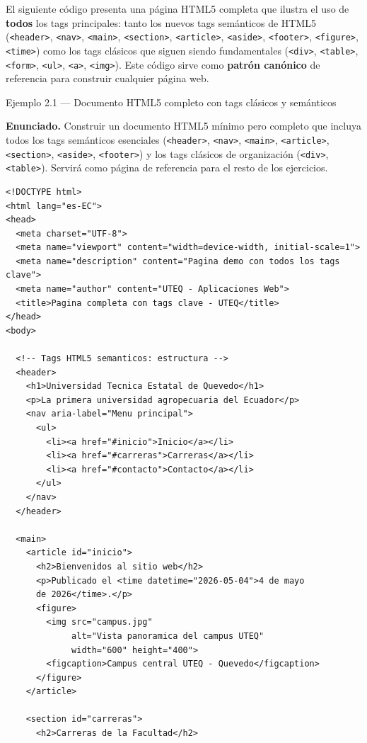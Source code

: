 El siguiente código presenta una página HTML5 completa que ilustra
el uso de \textbf{todos} los tags principales: tanto los nuevos tags
semánticos de HTML5 (\texttt{<header>}, \texttt{<nav>},
\texttt{<main>}, \texttt{<section>}, \texttt{<article>},
\texttt{<aside>}, \texttt{<footer>}, \texttt{<figure>},
\texttt{<time>}) como los tags clásicos que siguen siendo
fundamentales (\texttt{<div>}, \texttt{<table>}, \texttt{<form>},
\texttt{<ul>}, \texttt{<a>}, \texttt{<img>}). Este código sirve como
\textbf{patrón canónico} de referencia para construir cualquier
página web.

\begin{cajaejemplo}{Ejemplo 2.1 --- Documento HTML5 completo con tags clásicos y semánticos}

\textbf{Enunciado.} Construir un documento HTML5 mínimo pero completo que incluya todos los tags semánticos esenciales (\texttt{<header>}, \texttt{<nav>}, \texttt{<main>}, \texttt{<article>}, \texttt{<section>}, \texttt{<aside>}, \texttt{<footer>}) y los tags clásicos de organización (\texttt{<div>}, \texttt{<table>}). Servirá como página de referencia para el resto de los ejercicios.

\begin{lstlisting}[style=html,caption={pagina-completa.html},label=lst:2.1]
<!DOCTYPE html>
<html lang="es-EC">
<head>
  <meta charset="UTF-8">
  <meta name="viewport" content="width=device-width, initial-scale=1">
  <meta name="description" content="Pagina demo con todos los tags clave">
  <meta name="author" content="UTEQ - Aplicaciones Web">
  <title>Pagina completa con tags clave - UTEQ</title>
</head>
<body>

  <!-- Tags HTML5 semanticos: estructura -->
  <header>
    <h1>Universidad Tecnica Estatal de Quevedo</h1>
    <p>La primera universidad agropecuaria del Ecuador</p>
    <nav aria-label="Menu principal">
      <ul>
        <li><a href="#inicio">Inicio</a></li>
        <li><a href="#carreras">Carreras</a></li>
        <li><a href="#contacto">Contacto</a></li>
      </ul>
    </nav>
  </header>

  <main>
    <article id="inicio">
      <h2>Bienvenidos al sitio web</h2>
      <p>Publicado el <time datetime="2026-05-04">4 de mayo
      de 2026</time>.</p>
      <figure>
        <img src="campus.jpg"
             alt="Vista panoramica del campus UTEQ"
             width="600" height="400">
        <figcaption>Campus central UTEQ - Quevedo</figcaption>
      </figure>
    </article>

    <section id="carreras">
      <h2>Carreras de la Facultad</h2>


\end{lstlisting}
\end{cajaejemplo}
